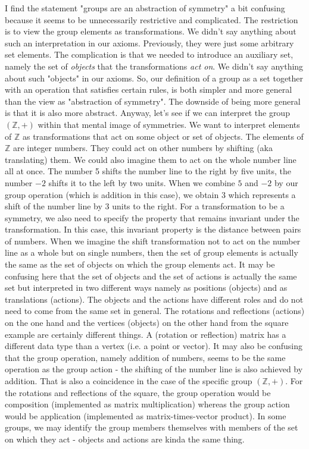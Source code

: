\medskip
I find the statement "groups are an abstraction of symmetry" a bit confusing because it seems to be unnecessarily restrictive and complicated. The restriction is to view the group elements as transformations. We didn't say anything about such an interpretation in our axioms. Previously, they were just some arbitrary set elements. The complication is that we needed to introduce an auxiliary set, namely the set of \emph{objects} that the transformations \emph{act on}. We didn't say anything about such "objects" in our axioms. So, our definition of a group as a set together with an operation that satisfies certain rules, is both simpler and more general than the view as "abstraction of symmetry". The downside of being more general is that it is also more abstract. Anyway, let's see if we can interpret the group $(\mathbb{Z},+)$ within that mental image of symmetries. We want to interpret elements of $\mathbb{Z}$ as transformations that act on some object or set of objects. The elements of $\mathbb{Z}$ are integer numbers. They could act on other numbers by shifting (aka translating) them. We could also imagine them to act on the whole number line all at once. The number 5 shifts the number line to the right by five units, the number $-2$ shifts it to the left by two units. When we combine $5$ and $-2$ by our group operation (which is addition in this case), we obtain $3$ which represents a shift of the number line by $3$ units to the right. For a transformation to be a symmetry, we also need to specify the property that remains invariant under the transformation. In this case, this invariant property is the distance between pairs of numbers. When we imagine the shift transformation not to act on the number line as a whole but on single numbers, then the set of group elements is actually the same as the set of objects on which the group elements act. It may be confusing here that the set of objects and the set of actions is actually the same set but interpreted in two different ways namely as positions (objects) and as translations (actions). The objects and the actions have different roles and do not need to come from the same set in general. The rotations and reflections (actions) on the one hand and the  vertices (objects) on the other hand from the square example are certainly different things. A (rotation or reflection) matrix has a different data type than a vertex (i.e. a point or vector). It may also be confusing that the group operation, namely addition of numbers, seems to be the same operation as the group action - the shifting of the number line is also achieved by addition. That is also a coincidence in the case of the specific group $(\mathbb{Z},+)$. For the rotations and reflections of the square, the group operation would be composition (implemented as matrix multiplication) whereas the group action would be application (implemented as matrix-times-vector product). In some groups, we may identify the group members themselves with members of the set on which they act - objects and actions are kinda the same thing. 


